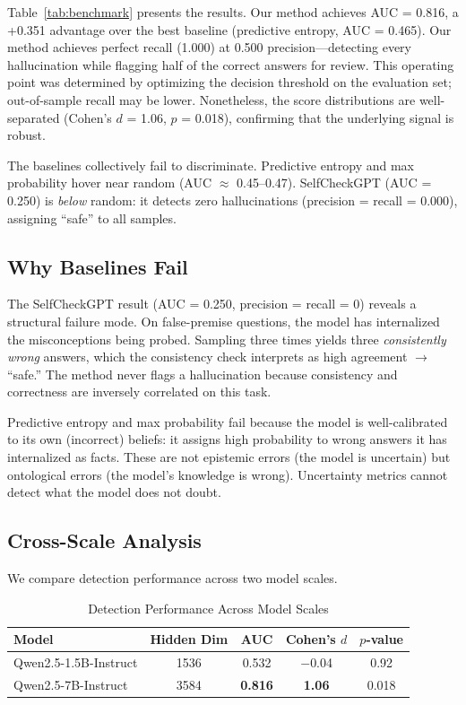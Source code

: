 \documentclass[11pt]{article}
\begin{document}
Table~\ref{tab:benchmark} presents the results. Our method achieves AUC = 0.816, a +0.351 advantage over the best baseline (predictive entropy, AUC = 0.465). Our method achieves perfect recall (1.000) at 0.500 precision---detecting every hallucination while flagging half of the correct answers for review. This operating point was determined by optimizing the decision threshold on the evaluation set; out-of-sample recall may be lower. Nonetheless, the score distributions are well-separated (Cohen's $d$ = 1.06, $p$ = 0.018), confirming that the underlying signal is robust.

The baselines collectively fail to discriminate. Predictive entropy and max probability hover near random (AUC $\approx$ 0.45--0.47). SelfCheckGPT (AUC = 0.250) is \textit{below} random: it detects zero hallucinations (precision = recall = 0.000), assigning ``safe'' to all samples.

\subsection{Why Baselines Fail}

The SelfCheckGPT result (AUC = 0.250, precision = recall = 0) reveals a structural failure mode. On false-premise questions, the model has internalized the misconceptions being probed. Sampling three times yields three \textit{consistently wrong} answers, which the consistency check interprets as high agreement $\rightarrow$ ``safe.'' The method never flags a hallucination because consistency and correctness are inversely correlated on this task.

Predictive entropy and max probability fail because the model is well-calibrated to its own (incorrect) beliefs: it assigns high probability to wrong answers it has internalized as facts. These are not epistemic errors (the model is uncertain) but ontological errors (the model's knowledge is wrong). Uncertainty metrics cannot detect what the model does not doubt.

\subsection{Cross-Scale Analysis}

We compare detection performance across two model scales.

\begin{table}[h]
\centering
\caption{Detection Performance Across Model Scales}
\label{tab:scale}
\begin{tabular}{lcccc}
\toprule
\textbf{Model} & \textbf{Hidden Dim} & \textbf{AUC} & \textbf{Cohen's $d$} & \textbf{$p$-value} \\
\midrule
Qwen2.5-1.5B-Instruct & 1536 & 0.532 & $-$0.04 & 0.92 \\
Qwen2.5-7B-Instruct & 3584 & \textbf{0.816} & \textbf{1.06} & 0.018 \\
\bottomrule
\end{tabular}
\end{table}
\end{document}
